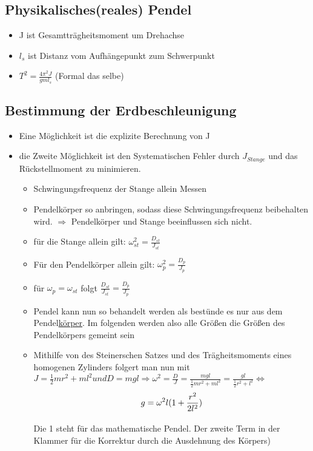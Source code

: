 \documentclass[a4paper,12pt]{scrartcl}
\begin{document}
\subsection{Physikalisches(reales) Pendel}
\begin{itemize}
\item J ist Gesamtträgheitsmoment um Drehachse
\item $l_s$ ist Distanz vom Aufhängepunkt zum Schwerpunkt
\item $T^2= \frac{4 \pi^2 J}{g m l_s}$ (Formal das selbe)
\end{itemize}
\subsection{Bestimmung der Erdbeschleunigung}
\begin{itemize}
\item Eine Möglichkeit ist die explizite Berechnung von J
\item die Zweite Möglichkeit ist den Systematischen Fehler durch $J_{Stange}$ und das Rückstellmoment zu minimieren. 
\begin{itemize}
\item Schwingungsfrequenz der Stange allein Messen
\item Pendelkörper so anbringen, sodass diese Schwingungsfrequenz beibehalten wird. $\Rightarrow$ Pendelkörper und Stange beeinflussen sich nicht. 
\item für die Stange allein gilt: $\omega_{st}^2=\frac{D_{st}}{J_{st}}$
\item Für den Pendelkörper allein gilt: $\omega_{p}^2=\frac{D_{p}}{J_{p}}$
\item für $\omega_p=\omega_{st}$ folgt $\frac{D_{st}}{J_{st}}=\frac{D_{p}}{J_{p}}$
\item Pendel kann nun so behandelt werden als bestünde es nur aus dem Pendel\underline{körper}. Im folgenden werden also alle Größen die Größen des Pendelkörpers gemeint sein
\item Mithilfe von des Steinerschen Satzes und des Trägheitsmoments eines homogenen Zylinders folgert man nun mit $J=\frac{1}{2}m r^2 + ml^2 und D= mgl \Rightarrow \omega^2=\frac{D}{J}=\frac{mgl}{\frac{1}{2}m r^2 + ml^2}=\frac{gl}{\frac{1}{2}r^2+l^2} \Leftrightarrow$
\begin{equation}
  \underset{\mbox{{\small $$}}}{g=\omega^2 l (1+\frac{r^2}{2l^2})} \label{Erdbeschleunigung}
\end{equation}
Die 1 steht für das mathematische Pendel. Der zweite Term in der Klammer für die Korrektur durch die Ausdehnung des Körpers)
\end{itemize}
\end{itemize}
\end{document}
